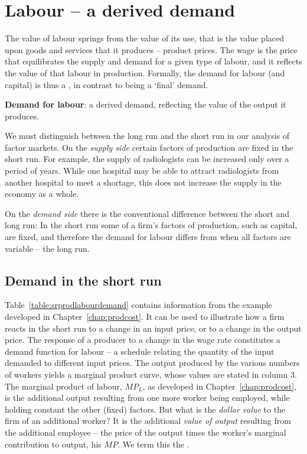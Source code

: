 \section{Labour -- a derived demand}\label{sec:ch12sec1}

The value of labour springs from the value of its use, that is the value
placed upon goods and services that it produces -- product prices. The wage
is the price that equilibrates the supply and demand for a given type of
labour, and it reflects the value of that labour in production. Formally,
the demand for labour (and capital) is thus a ,
in contrast to being a `final' demand.

\begin{DefBox}
\textbf{Demand for labour}: a derived demand, reflecting the value of the output it produces.
\end{DefBox}

We must distinguish between the long run and the short run in our analysis
of factor markets. On the \textit{supply side} certain factors of production
are fixed in the short run. For example, the supply of radiologists can be
increased only over a period of years. While one hospital may be able to
attract radiologists from another hospital to meet a shortage, this does not
increase the supply in the economy as a whole.

On the \textit{demand side} there is the conventional difference between the
short and long run: In the short run some of a firm's factors of production,
such as capital, are fixed, and therefore the demand for labour differs from
when all factors are variable -- the long run.

\newhtmlpage

\subsection*{Demand in the short run}

Table~\ref{table:srprodlabourdemand} contains information from the example
developed in Chapter~\ref{chap:prodcost}. It can be used to illustrate how a
firm reacts in the short run to a change in an input price, or to a change
in the output price. The response of a producer to a change in the wage rate
constitutes a demand function for labour -- a schedule relating the quantity
of the input demanded to different input prices. The output produced by the
various numbers of workers yields a marginal product curve, whose values are
stated in column 3. The marginal product of labour, $MP_{L}$, as developed
in Chapter~\ref{chap:prodcost}, is the additional output resulting from one
more worker being employed, while holding constant the other (fixed)
factors. But what is the \textit{dollar value} to the firm of an additional
worker? It is the additional \textit{value of output} resulting from the
additional employee -- the price of the output times the worker's marginal
contribution to output, his $MP$. We term this the .


